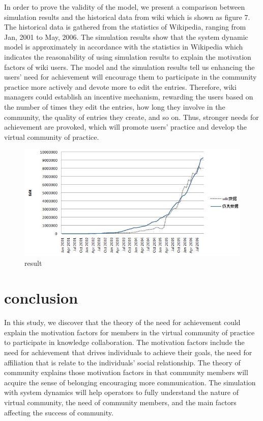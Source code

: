 \documentclass{elsarticle}
\begin{document}
In order to prove the validity of the model, we present a comparison between simulation results and the historical data from wiki which is shown as figure 7. The historical data is gathered from the statistics of Wikipedia, ranging from Jan, 2001 to May, 2006. 
The simulation results show that the system dynamic model is
approximately in accordance with the statistics in Wikipedia which
indicates the reasonability of using simulation results to explain the
motivation factors of wiki users. The model and the simulation results
tell us enhancing the users’ need for achievement will encourage them
to participate in the community practice more actively and devote more
to edit the entries. Therefore, wiki managers could establish an
incentive mechanism, rewarding the users based on the number of times
they edit the entries, how long they involve in the community, the
quality of entries they create, and so on. Thus, stronger needs for
achievement are provoked, which will promote users’ practice and
develop the virtual community of practice. 

\begin{figure}[htpb]
  \centering
  \includegraphics{07}
  \caption{result}
\end{figure}

\section{conclusion}
\label{sec:conclusion}

 In this study, we discover that the theory of the need for
 achievement could explain the motivation factors for members in the
 virtual community of practice to participate in knowledge
 collaboration. The motivation factors include the need for
 achievement that drives individuals to achieve their goals, the need
 for affiliation that is relate to the individuals’ social
 relationship. The theory of community explains those motivation
 factors in that community members will acquire  the sense of
 belonging encouraging more communication. The simulation with system
 dynamics will help operators to fully understand the nature of
 virtual community, the need of community members, and the main
 factors affecting the success of community.
\end{document}
